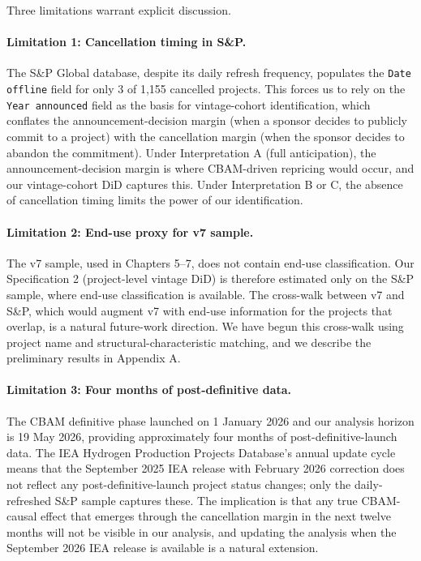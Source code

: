 \documentclass[11pt,a4paper]{article}
\begin{document}
Three limitations warrant explicit discussion.

\paragraph{Limitation 1: Cancellation timing in S\&P.}
The S\&P Global database, despite its daily refresh frequency, populates the \texttt{Date offline} field for only 3 of 1{,}155 cancelled projects. This forces us to rely on the \texttt{Year announced} field as the basis for vintage-cohort identification, which conflates the announcement-decision margin (when a sponsor decides to publicly commit to a project) with the cancellation margin (when the sponsor decides to abandon the commitment). Under Interpretation A (full anticipation), the announcement-decision margin is where CBAM-driven repricing would occur, and our vintage-cohort DiD captures this. Under Interpretation B or C, the absence of cancellation timing limits the power of our identification.

\paragraph{Limitation 2: End-use proxy for v7 sample.}
The v7 sample, used in Chapters 5--7, does not contain end-use classification. Our Specification 2 (project-level vintage DiD) is therefore estimated only on the S\&P sample, where end-use classification is available. The cross-walk between v7 and S\&P, which would augment v7 with end-use information for the projects that overlap, is a natural future-work direction. We have begun this cross-walk using project name and structural-characteristic matching, and we describe the preliminary results in Appendix A.

\paragraph{Limitation 3: Four months of post-definitive data.}
The CBAM definitive phase launched on 1 January 2026 and our analysis horizon is 19 May 2026, providing approximately four months of post-definitive-launch data. The IEA Hydrogen Production Projects Database's annual update cycle means that the September 2025 IEA release with February 2026 correction does not reflect any post-definitive-launch project status changes; only the daily-refreshed S\&P sample captures these. The implication is that any true CBAM-causal effect that emerges through the cancellation margin in the next twelve months will not be visible in our analysis, and updating the analysis when the September 2026 IEA release is available is a natural extension.
\end{document}
